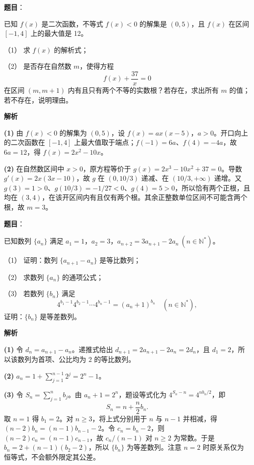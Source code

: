 \begin{answer}

\textbf{题目}：

已知 $f(x)$ 是二次函数，不等式 $f(x)<0$ 的解集是 $(0,5)$，且 $f(x)$ 在区间 $[-1,4]$ 上的最大值是 12。

（1） 求 $f(x)$ 的解析式；

（2） 是否存在自然数 $m$，使得方程
\nopagebreak[4]
\[
f(x)+\frac{37}{x}=0
\]
在区间 $(m,m+1)$ 内有且只有两个不等的实数根？若存在，求出所有 $m$ 的值；若不存在，说明理由。

\textbf{解析}

\textbf{(1)} 由 $f(x)<0$ 的解集为 $(0,5)$，设 $f(x)=a x(x-5)$，$a>0$。开口向上的二次函数在 $[-1,4]$ 上最大值取于端点；$f(-1)=6a$、$f(4)=-4a$，故 $6a=12$，得 $f(x)=2x^2-10x$。

\textbf{(2)} 在自然数区间中 $x>0$，原方程等价于 $g(x)=2x^3-10x^2+37=0$。导数 $g'(x)=2x(3x-10)$，故 $g$ 在 $(0,10/3)$ 递减、在 $(10/3,+\infty)$ 递增。又 $g(3)=1>0$、$g(10/3)=-1/27<0$、$g(4)=5>0$，所以恰有两个正根，且均在 $(3,4)$，在该开区间内有且仅有两个根。其余正整数单位区间不可能含两个根，故 $m=3$。



\end{answer}
\begin{answer}

\textbf{题目}：

已知数列 $\{a_n\}$ 满足 $a_1=1$，$a_2=3$，$a_{n+2}=3a_{n+1}-2a_n\ (n\in\mathbb{N}^*)$。

（1） 证明：数列 $\{a_{n+1}-a_n\}$ 是等比数列；

（2） 求数列 $\{a_n\}$ 的通项公式；

（3） 若数列 $\{b_n\}$ 满足
\nopagebreak[4]
\[
4^{b_1-1}4^{b_2-1}\cdots 4^{b_n-1}=(a_n+1)^{b_n}\quad(n\in\mathbb{N}^*),
\]
证明：$\{b_n\}$ 是等差数列。

\textbf{解析}

\textbf{(1)} 令 $d_n=a_{n+1}-a_n$。递推式给出 $d_{n+1}=2a_{n+1}-2a_n=2d_n$，且 $d_1=2$，所以该数列为首项、公比均为 $2$ 的等比数列。

\textbf{(2)} $a_n=1+\sum_{j=1}^{n-1}2^j=2^n-1$。

\textbf{(3)} 令 $S_n=\sum_{j=1}^n b_j$。由 $a_n+1=2^n$，题设等式化为 $4^{S_n-n}=4^{nb_n/2}$，即
\nopagebreak[4]
\[
S_n=n+\frac n2 b_n.
\]
取 $n=1$ 得 $b_1=2$。对 $n\ge3$，将上式分别用于 $n$ 与 $n-1$ 并相减，得 $(n-2)b_n=(n-1)b_{n-1}-2$。令 $c_n=b_n-2$，则 $(n-2)c_n=(n-1)c_{n-1}$，故 $c_n/(n-1)$ 对 $n\ge2$ 为常数。于是 $b_n=2+(n-1)(b_2-2)$，所以 $\{b_n\}$ 为等差数列。注意 $n=2$ 时原关系仅为恒等式，不会额外限定其公差。




\end{answer}